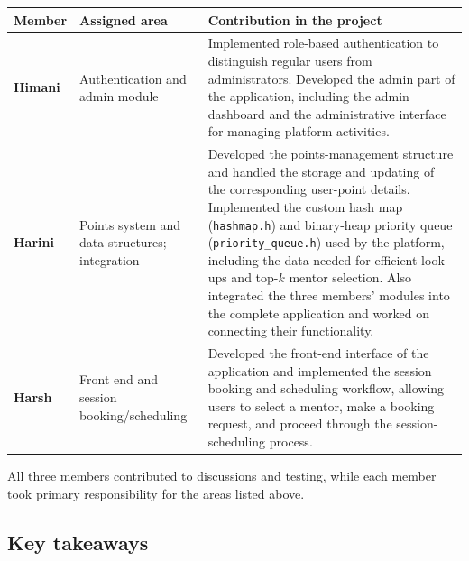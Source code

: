 \documentclass[11pt,a4paper]{article}
\begin{document}
\begin{center}\small
\begin{tabular}{p{2.6cm}p{3.8cm}p{8.1cm}}\toprule
Member & Assigned area & Contribution in the project\\\midrule

\textbf{Himani}\newline 106125041 & Authentication and admin module &
Implemented role-based authentication to distinguish regular users from administrators. Developed the admin part of the application, including the admin dashboard and the administrative interface for managing platform activities.\\[5pt]

\textbf{Harini}\newline 106125037 & Points system and data structures; integration &
Developed the points-management structure and handled the storage and updating of the corresponding user-point details. Implemented the custom hash map (\texttt{hashmap.h}) and binary-heap priority queue (\texttt{priority\_queue.h}) used by the platform, including the data needed for efficient look-ups and top-$k$ mentor selection. Also integrated the three members' modules into the complete application and worked on connecting their functionality.\\[5pt]

\textbf{Harsh}\newline 106125039 & Front end and session booking/scheduling &
Developed the front-end interface of the application and implemented the session booking and scheduling workflow, allowing users to select a mentor, make a booking request, and proceed through the session-scheduling process.\\
\bottomrule
\end{tabular}
\end{center}

All three members contributed to discussions and testing, while each member took primary responsibility for the areas listed above.

\subsection{Key takeaways}
\end{document}
